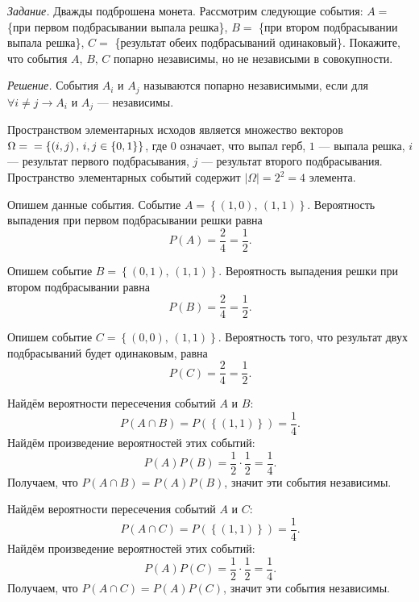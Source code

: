 \textit{Задание.} Дважды подброшена монета.
Рассмотрим следующие события:
$A =$ \{при первом подбрасывании выпала решка\}, $B =$ \{при втором подбрасывании выпала решка\}, $C =$ \{результат обеих подбрасываний одинаковый\}.
Покажите, что события $A, \, B, \, C$ попарно независимы, но не независыми в совокупности.

\textit{Решение.} События $A_i$ и $A_j$ называются попарно независимыми, если для $ \forall i \neq j \rightarrow A_i $ и $A_j$ --- независимы.

Пространством элементарных исходов является множество векторов
$ \Omega = \\
= \left\{ \left( i, j \right), \, i, j \in \left\{ 0, 1 \right\} \right\}$,
где $0$ означает, что выпал герб, $1$ --- выпала решка, $i$ --- результат первого подбрасывания, $j$ --- результат второго подбрасывания.
Пространство элементарных событий содержит $ \left| \Omega \right| = 2^2 = 4$ элемента.

Опишем данные события.
Событие $A = \left\{ \left( 1, 0 \right), \, \left( 1, 1 \right) \right\} $.
Вероятность выпадения при первом подбрасывании решки равна
$$P \left( A \right) =
\frac{2}{4} =
\frac{1}{2}.$$

Опишем событие $B = \left\{ \left( 0, 1 \right), \, \left( 1, 1 \right) \right\} $.
Вероятность выпадения решки при втором подбрасывании равна
$$P \left( B \right) =
\frac{2}{4} =
\frac{1}{2}.$$

Опишем событие $C = \left\{ \left( 0, 0 \right), \, \left( 1, 1 \right) \right\} $.
Вероятность того, что результат двух подбрасываний будет одинаковым, равна
$$P \left( C \right) =
\frac{2}{4} =
\frac{1}{2}.$$

Найдём вероятности пересечения событий $A$ и $B$:
$$P \left( A \cap B \right) =
P \left( \left\{ \left( 1, 1 \right) \right\} \right) =
\frac{1}{4}.$$
Найдём произведение вероятностей этих событий:
$$P \left( A \right) P \left( B \right) =
\frac{1}{2} \cdot \frac{1}{2} =
\frac{1}{4}.$$
Получаем, что $P \left( A \cap B \right) = P \left( A \right) P \left( B \right) $, значит эти события независимы.

Найдём вероятности пересечения событий $A$ и $C$:
$$P \left( A \cap C \right) =
P \left( \left\{ \left( 1, 1 \right) \right\} \right) =
\frac{1}{4}.$$
Найдём произведение вероятностей этих событий:
$$P \left( A \right) P \left( C \right) =
\frac{1}{2} \cdot \frac{1}{2} =
\frac{1}{4}.$$
Получаем, что $P \left( A \cap C \right) = P \left( A \right) P \left( C \right) $, значит эти события независимы.

